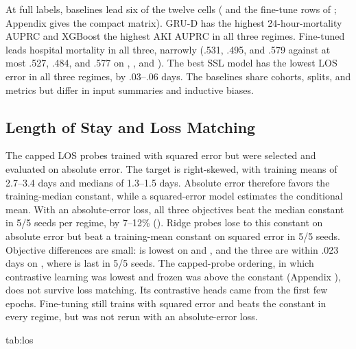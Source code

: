 At full labels, baselines lead six of the twelve cells ( and the fine-tune rows of ; Appendix  gives the compact matrix). GRU-D has the highest 24-hour-mortality AUPRC and XGBoost the highest AKI AUPRC in all three regimes. Fine-tuned \MAE{} leads hospital mortality in all three, narrowly (.531, .495, and .579 against at most .527, .484, and .577 on \Combined{}, \EICU{}, and \MIMIC{}). The best SSL model has the lowest LOS error in all three regimes, by .03--.06 days. The baselines share cohorts, splits, and metrics but differ in input summaries and inductive biases.

\subsection{Length of Stay and Loss Matching}

The capped LOS probes trained with squared error but were selected and evaluated on absolute error. The target is right-skewed, with training means of 2.7--3.4 days and medians of 1.3--1.5 days. Absolute error therefore favors the training-median constant, while a squared-error model estimates the conditional mean. With an absolute-error loss, all three objectives beat the median constant in 5/5 seeds per regime, by 7--12\% (). Ridge probes lose to this constant on absolute error but beat a training-mean constant on squared error in 5/5 seeds. Objective differences are small: \MAE{} is lowest on \EICU{} and \Combined{}, and the three are within .023 days on \MIMIC{}, where \MAE{} is last in 5/5 seeds. The capped-probe ordering, in which contrastive learning was lowest and frozen \MAE{} was above the constant (Appendix ), does not survive loss matching. Its contrastive heads came from the first few epochs. Fine-tuning still trains with squared error and beats the constant in every regime, but was not rerun with an absolute-error loss.

\begin{table}[t]
\floatconts
  {tab:los}
  {\caption{Remaining-LOS absolute error in days, mean (sample SD), $n=5$; lower is better. Probe rows are linear probes on frozen final-epoch embeddings, trained with an absolute-error-type Huber loss (abs.) or ridge squared error (sq.). Fine-tune rows are the reference squared-error runs beside full-label baselines (Transf.: supervised Transformer). Const.\ predicts each seed's training-label median. Bold marks the lowest learned-model mean per row; in sq.\ probe rows the constant is lower.}}
  {\scriptsize
  }
\end{table}


